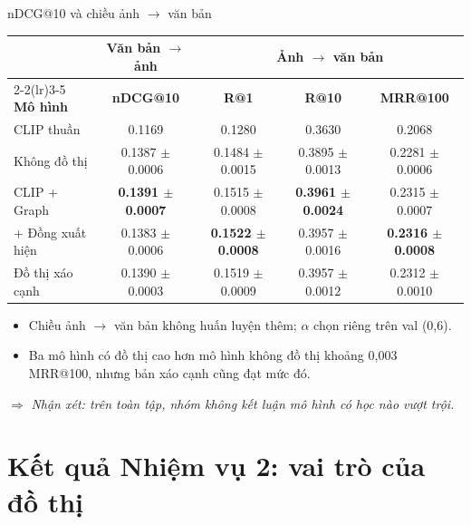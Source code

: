 \documentclass[10pt, aspectratio=169]{beamer}
\makeatletter
\newcommand{\nhanxet}[1]{\par\smallskip$\Rightarrow$ \textit{Nhận xét: #1}}
\newcommand{\mrr}{MRR@100}
\newcommand{\pmm}{\ensuremath{\pm}}
\makeatother
\begin{document}
\begin{frame}{nDCG@10 và chiều ảnh $\to$ văn bản}
  \centering\small
  \begin{tabular}{l c c c c}
    \toprule
    & \textbf{Văn bản $\to$ ảnh} & \multicolumn{3}{c}{\textbf{Ảnh $\to$ văn bản}} \\
    \cmidrule(lr){2-2}\cmidrule(lr){3-5}
    \textbf{Mô hình} & \textbf{nDCG@10} & \textbf{R@1} & \textbf{R@10} & \textbf{\mrr} \\
    \midrule
    CLIP thuần & 0.1169 & 0.1280 & 0.3630 & 0.2068 \\
    Không đồ thị & 0.1387 \pmm{} 0.0006 & 0.1484 \pmm{} 0.0015 & 0.3895 \pmm{} 0.0013 & 0.2281 \pmm{} 0.0006 \\
    CLIP + Graph & \textbf{0.1391 \pmm{} 0.0007} & 0.1515 \pmm{} 0.0008 & \textbf{0.3961 \pmm{} 0.0024} & 0.2315 \pmm{} 0.0007 \\
    + Đồng xuất hiện & 0.1383 \pmm{} 0.0006 & \textbf{0.1522 \pmm{} 0.0008} & 0.3957 \pmm{} 0.0016 & \textbf{0.2316 \pmm{} 0.0008} \\
    Đồ thị xáo cạnh & 0.1390 \pmm{} 0.0003 & 0.1519 \pmm{} 0.0009 & 0.3957 \pmm{} 0.0012 & 0.2312 \pmm{} 0.0010 \\
    \bottomrule
  \end{tabular}
  \vfill
  \begin{itemize}
    \item Chiều ảnh $\to$ văn bản không huấn luyện thêm; $\alpha$ chọn riêng trên val (0,6).
    \item Ba mô hình có đồ thị cao hơn mô hình không đồ thị khoảng 0,003 \mrr, nhưng bản xáo cạnh cũng đạt mức đó.
  \end{itemize}
  \nhanxet{trên toàn tập, nhóm không kết luận mô hình có học nào vượt trội.}
\end{frame}

\section{Kết quả Nhiệm vụ 2: vai trò của đồ thị}
\end{document}

